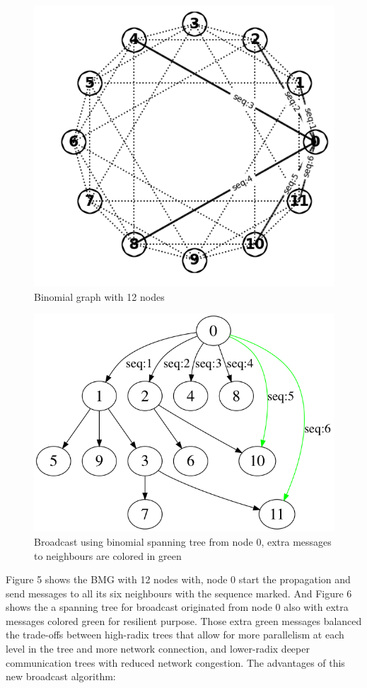 \documentclass[sigconf]{acmart}
\begin{document}
\begin{figure}
  \centering
  \includegraphics[width=\linewidth]{bmg_origin.png}
  \caption{Binomial graph with 12 nodes}
\end{figure}
\begin{figure}
  \centering
  \includegraphics[width=\linewidth]{reorder_seq.png}
  \caption{Broadcast using binomial spanning tree from node 0, extra messages to neighbours are colored in green }
\end{figure}
Figure 5 shows the BMG with 12 nodes with, node 0 start the propagation and send messages to all its six neighbours with the sequence marked. And Figure 6 shows the a spanning tree for broadcast originated from node 0 also with extra messages colored green for resilient purpose. Those extra green messages balanced the trade-offs between high-radix trees that allow for more parallelism at each level in the tree and more network connection, and lower-radix deeper communication trees with reduced network congestion. The advantages of this new broadcast algorithm:
\end{document}
